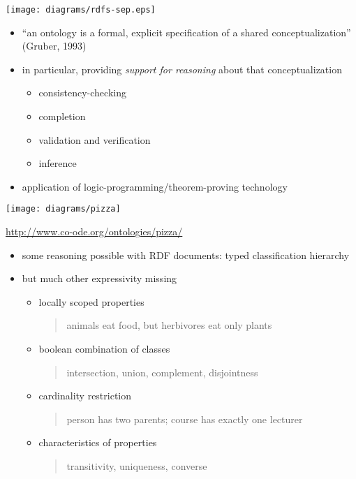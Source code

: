 \documentclass{sepslide-soa-faked} %
\begin{document}
\begin{slide}
\texttt{[image: diagrams/rdfs-sep.eps]}
\end{slide}

\begin{slide}
\begin{itemize}
\item ``an ontology is a formal, explicit specification of a shared conceptualization'' (Gruber, 1993)
\item in particular, providing \emph{support for reasoning} about that conceptualization
  \begin{itemize}
  \item consistency-checking
  \item completion
  \item validation and verification
  \item inference
  \end{itemize}
\item application of logic-programming/theorem-proving technology
\end{itemize}
\end{slide}

\begin{slide}
\begin{flushleft}
\texttt{[image: diagrams/pizza]}
\end{flushleft}
\url{http://www.co-ode.org/ontologies/pizza/}
\end{slide}

\begin{slide}
\begin{itemize}
\item some reasoning possible with RDF documents: typed classification hierarchy
\item but much other expressivity missing
  \begin{itemize}
  \item locally scoped properties
  \begin{quote}
  animals eat food, but herbivores eat only plants
  \end{quote}
  \item boolean combination of classes
  \begin{quote}
  intersection, union, complement, disjointness
  \end{quote}
  \item cardinality restriction
  \begin{quote}
  person has two parents; course has exactly one lecturer
  \end{quote}
  \item characteristics of properties 
  \begin{quote}
  transitivity, uniqueness, converse
  \end{quote}
  \end{itemize}
\end{itemize}
\end{slide}
\end{document}
